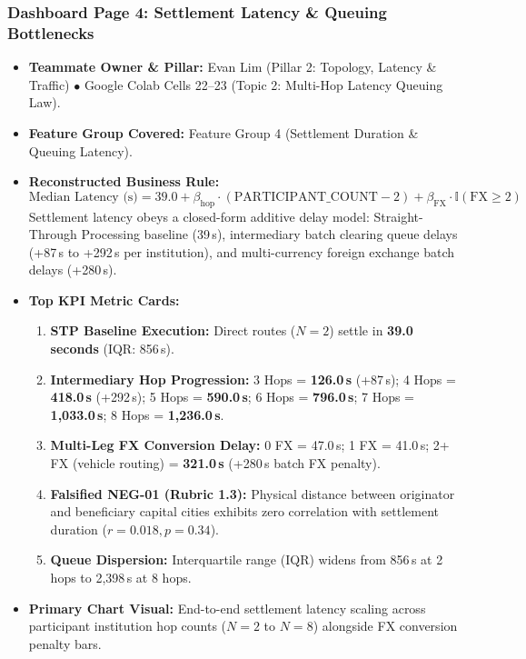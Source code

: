 \documentclass[11pt,a4paper]{article}
\begin{document}
\subsubsection{Dashboard Page 4: Settlement Latency \& Queuing Bottlenecks}
\begin{itemize}
    \item \textbf{Teammate Owner \& Pillar:} Evan Lim (Pillar 2: Topology, Latency \& Traffic) $\bullet$ Google Colab Cells 22--23 (Topic 2: Multi-Hop Latency Queuing Law).
    \item \textbf{Feature Group Covered:} Feature Group 4 (Settlement Duration \& Queuing Latency).
    \item \textbf{Reconstructed Business Rule:}
    \begin{equation}
    \text{Median Latency (s)} = 39.0 + \beta_{\text{hop}} \cdot (\text{PARTICIPANT\_COUNT} - 2) + \beta_{\text{FX}} \cdot \mathbb{I}(\text{FX} \ge 2)
    \end{equation}
    Settlement latency obeys a closed-form additive delay model: Straight-Through Processing baseline (39\,s), intermediary batch clearing queue delays (+87\,s to +292\,s per institution), and multi-currency foreign exchange batch delays (+280\,s).
    \item \textbf{Top KPI Metric Cards:}
    \begin{enumerate}
        \item \textbf{STP Baseline Execution:} Direct routes ($N=2$) settle in \textbf{39.0 seconds} (IQR: 856\,s).
        \item \textbf{Intermediary Hop Progression:} 3 Hops = \textbf{126.0\,s} (+87\,s); 4 Hops = \textbf{418.0\,s} (+292\,s); 5 Hops = \textbf{590.0\,s}; 6 Hops = \textbf{796.0\,s}; 7 Hops = \textbf{1,033.0\,s}; 8 Hops = \textbf{1,236.0\,s}.
        \item \textbf{Multi-Leg FX Conversion Delay:} 0 FX = 47.0\,s; 1 FX = 41.0\,s; 2+ FX (vehicle routing) = \textbf{321.0\,s} (+280\,s batch FX penalty).
        \item \textbf{Falsified NEG-01 (Rubric 1.3):} Physical distance between originator and beneficiary capital cities exhibits zero correlation with settlement duration ($r = 0.018, p = 0.34$).
        \item \textbf{Queue Dispersion:} Interquartile range (IQR) widens from 856\,s at 2 hops to 2,398\,s at 8 hops.
    \end{enumerate}
    \item \textbf{Primary Chart Visual:} End-to-end settlement latency scaling across participant institution hop counts ($N=2$ to $N=8$) alongside FX conversion penalty bars.

\end{itemize}
\end{document}
